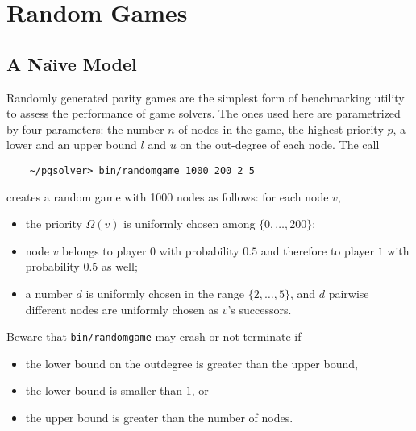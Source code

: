 

%

\section{Random Games}

\subsection{A Na\"{\i}ve Model}
Randomly generated parity games are the simplest form of benchmarking utility to assess the
performance of game solvers. The ones used here are parametrized by four parameters: the number
$n$ of nodes in the game, the highest priority $p$, a lower and an upper bound $l$ and $u$ on the
out-degree of each node. The call
\begin{verbatim}
    ~/pgsolver> bin/randomgame 1000 200 2 5
\end{verbatim}
creates a random game with 1000 nodes as follows: for each node $v$,
\begin{itemize}
\item the priority $\Omega(v)$ is uniformly chosen among $\{0,\ldots,200\}$;
\item node $v$ belongs to player $0$ with probability $0.5$ and therefore to player $1$ with
      probability $0.5$ as well;
\item a number $d$ is uniformly chosen in the range $\{2,\ldots,5\}$, and $d$ pairwise different
      nodes are uniformly chosen as $v$'s successors.
\end{itemize}
Beware that \texttt{bin/randomgame} may crash or not terminate if 
\begin{itemize}
\item the lower bound on the outdegree is greater than the upper bound,
\item the lower bound is smaller than $1$, or
\item the upper bound is greater than the number of nodes.
\end{itemize}


